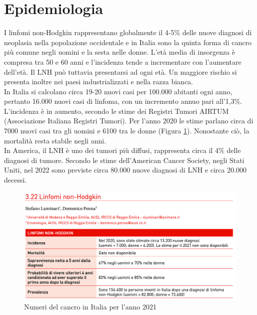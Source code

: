 \section{Epidemiologia}
I linfomi non-Hodgkin rappresentano globalmente il 4-5\% delle nuove diagnosi di neoplasia nella popolazione 
occidentale e in Italia sono la quinta forma di cancro più comune negli uomini e la sesta nelle donne\cite{AIOM}. 
L’età media di insorgenza è compresa tra 50 e 60 anni e l’incidenza tende a incrementare con l’aumentare dell’età. 
Il LNH può tuttavia presentarsi ad ogni età.
Un maggiore rischio si presenta inoltre nei paesi industrializzati e nella razza bianca\cite{AMERICANCS}.\\ 
In Italia si calcolano circa 19-20 nuovi casi per 100.000 abitanti ogni anno, pertanto 16.000 nuovi casi di linfoma, 
con un incremento annuo pari all’1,3\%\cite{AIOM}.\\
L’incidenza è in aumento, secondo le stime dei Registri Tumori AIRTUM (Associazione Italiana Registri Tumori).
Per l’anno 2020 le stime parlano circa di 7000 nuovi casi tra gli uomini e 6100 tra le donne (Figura \ref{fig:FIGURE_2.3}). 
Nonostante ciò, la mortalità resta stabile negli anni\cite{AIRC}.\\
In America, il LNH è uno dei tumori più diffusi, rappresenta circa il 4\% delle diagnosi di tumore\cite{Americanstatistic}. 
Secondo le stime dell’American Cancer Society, negli Stati Uniti, nel 2022 sono previste circa 80.000 nuove 
diagnosi di LNH e circa 20.000 decessi.

\begin{figure}[H]
    \begin{center}
    \includegraphics[width=0.8\columnwidth]{img/2021.png}
    \vspace{-3mm}
    \end{center}
    \caption{Numeri del cancro in Italia per l’anno 2021
    \cite{img4-6-7}}
    \label{fig:FIGURE_2.3}
\end{figure}


